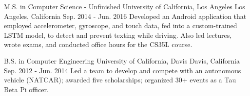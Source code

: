 

\begin{cventries}

  \cventry
    {M.S. in Computer Science - Unfinished} %
    {University of California, Los Angeles} %
    {Los Angeles, California} %
    {Sep. 2014 - Jun. 2016} %
    {Developed an Android application that employed accelerometer, gyroscope, and touch data, fed into a custom-trained LSTM model, to detect and prevent texting while driving. Also led lectures, wrote exams, and conducted office hours for the CS35L course.} %
    {}

  \cventry
    {B.S. in Computer Engineering} %
    {University of California, Davis} %
    {Davis, California} %
    {Sep. 2012 - Jun. 2014} %
    {Led a team to develop and compete with an autonomous vehicle (NATCAR); awarded five scholarships; organized 30+ events as a Tau Beta Pi officer.}
    {}

\end{cventries}
